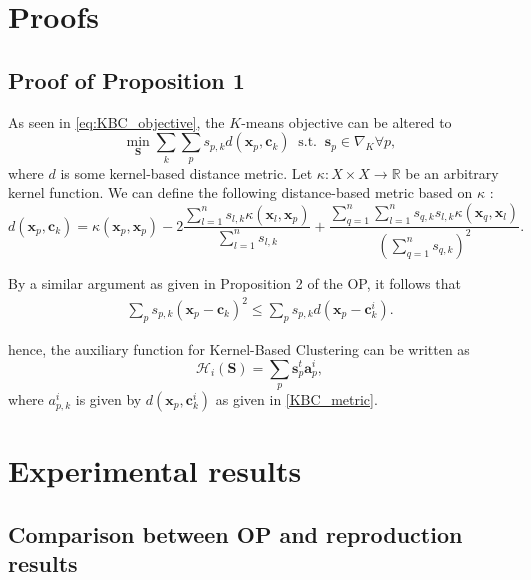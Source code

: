 \section{Proofs}
\label{appendix:proof_prop_1}

\subsection*{Proof of Proposition 1}

	As seen in \autoref{eq:KBC_objective}, the $K$-means objective can be altered to
	$$\min_{\mathbf{S}} \sum_k \sum_p s_{p, k} d(\textbf{x}_p, \textbf{c}_k) ~\text{ s.t. }~ \textbf{s}_p \in \nabla_K \forall p,$$
	where $d$ is some kernel-based distance metric. Let $\kappa: X \times X \to \mathbb{R}$ be an arbitrary kernel function. We can define the following distance-based metric based on $\kappa$ \cite{hall2012objective}:
	\begin{equation}
		\label{KBC_metric}
		d(\textbf{x}_p, \textbf{c}_k) = \kappa(\textbf{x}_p, \textbf{x}_p) - 2 \frac{\sum_{l=1}^n s_{l, k} \kappa(\textbf{x}_l, \textbf{x}_p)}{\sum_{l=1}^n s_{l, k}} + \frac{\sum_{q=1}^n \sum_{l=1}^n s_{q, k} s_{l, k} \kappa(\textbf{x}_q, \textbf{x}_l)}{(\sum_{q=1}^n s_{q, k})^2}.
	\end{equation}
	
	By a similar argument as given in Proposition 2 of the OP, it follows that
	\begin{align*}
		\sum_p s_{p, k}(\textbf{x}_p - \textbf{c}_k)^2 \leq \sum_p s_{p, k}d(\textbf{x}_p - \textbf{c}^i_k).
	\end{align*}
	
	hence, the auxiliary function for Kernel-Based Clustering can be written as
	\begin{equation*}
		\mathcal{H}_i(\mathbf{S}) = \sum_p \textbf{s}_p^t  \textbf{a}_p^i,
	\end{equation*}
	where $a_{p, k}^i$ is given by $d(\textbf{x}_p, \textbf{c}_k^i)$ as given in \autoref{KBC_metric}.





\section{Experimental results}\label{appendix:figsandtabs}
\label{figures}

\subsection*{Comparison between OP and reproduction results}

